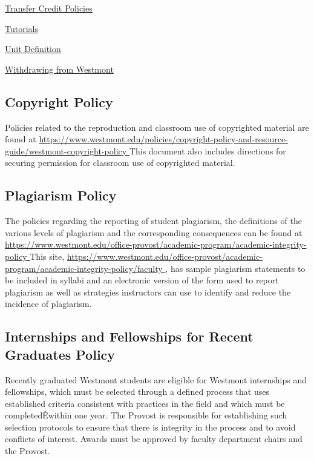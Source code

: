 		\href{https://www.westmont.edu/office-registrar/academic-policies-and-procedures/transfer-credit-policies} {Transfer Credit Policies}

		\href{https://www.westmont.edu/office-registrar/academic-policies-and-procedures/tutorials} {Tutorials}

		\href{https://www.westmont.edu/office-registrar/academic-policies-and-procedures/unit-definition} {Unit Definition}

		\href{https://www.westmont.edu/office-registrar/academic-policies-and-procedures/withdrawing-westmont-college} {Withdrawing from Westmont}



	\subsection{Copyright Policy}
		Policies related to the reproduction and classroom use of copyrighted
		material are found at
		\href{
			https://www.westmont.edu/policies/copyright-policy-and-resource-guide/westmont-copyright-policy
		}{\url{
				https://www.westmont.edu/policies/copyright-policy-and-resource-guide/westmont-copyright-policy
			}}
		This document also includes directions for securing permission for classroom use of copyrighted material.
	\subsection{Plagiarism Policy}
		The policies regarding the reporting of student plagiarism, the definitions
		of the various levels of plagiarism and the corresponding consequences can be
		found at
		\href{
			https://www.westmont.edu/office-provost/academic-program/academic-integrity-policy
		}
		{\url{
				https://www.westmont.edu/office-provost/academic-program/academic-integrity-policy
			}}
		This site,
		\href{
			https://www.westmont.edu/office-provost/academic-program/academic-integrity-policy/faculty
		}
		{\url{
				https://www.westmont.edu/office-provost/academic-program/academic-integrity-policy/faculty
			}},
		has sample plagiarism statements to be included
		in syllabi and an electronic version of the form used to report plagiarism as well as strategies instructors can use to identify and reduce the incidence of plagiarism.
	\subsection{Internships and Fellowships for Recent Graduates Policy}
		Recently graduated Westmont students are eligible for Westmont internships and fellowships, which must be selected through a defined process that uses established criteria consistent with practices in the field and which must be completedÊwithin one year. The Provost is responsible for establishing such selection protocols to ensure that there is integrity in the process and to avoid conflicts of interest. Awards must be approved by faculty department chairs and the Provost.
